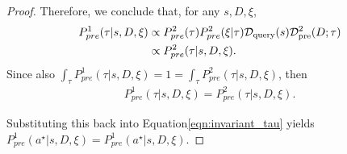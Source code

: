 \begin{proof}
    Therefore, we conclude that, for any $s, D, \xi$,
    \begin{align}
        P^1_{pre}(\tau| s, D, \xi) & \propto P^2_{pre}(\tau) P^2_{pre} (\xi | \tau)  \mathcal{D}_{\text{query}}(s) \mathcal{D}_{\text{pre}}^2 (D ; \tau) \\
        & \propto P^2_{pre}(\tau| s, D, \xi). 
    \end{align}
    Since also $\int_{\tau} P^1_{pre}(\tau| s, D, \xi) = 1 = \int_{\tau} P^2_{pre}(\tau| s, D, \xi) $, then 
    \begin{align}
P^1_{pre}(\tau| s, D, \xi) =  P^2_{pre}(\tau| s, D, \xi).
\end{align}
    
    Substituting this back into Equation\ref{eqn:invariant_tau} yields $P^1_{pre} ( a^\star | s, D, \xi) = P^1_{pre} ( a^\star | s, D, \xi)$.
\end{proof}




